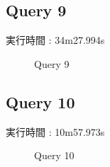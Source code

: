 \documentclass[11pt,a4paper]{jsarticle}
\newlength{\subfigwidth}
\newlength{\subfigcolsep}
\begin{document}
\subsection{Query 9}
実行時間 : 34m27.994s

\begin{figure}[bthp]
 \setlength{\subfigwidth}{.5\linewidth}
 \addtolength{\subfigwidth}{-.5\subfigcolsep}
 \begin{minipage}[b]{\subfigwidth}
 \end{minipage}
 \begin{minipage}[b]{\subfigwidth}
 \end{minipage}
  \caption{Query 9}
  \label{fig:q9}
\end{figure}

\subsection{Query 10}
実行時間 : 10m57.973s

\begin{figure}[bthp]
 \setlength{\subfigwidth}{.5\linewidth}
 \addtolength{\subfigwidth}{-.5\subfigcolsep}
 \begin{minipage}[b]{\subfigwidth}
 \end{minipage}
 \begin{minipage}[b]{\subfigwidth}
 \end{minipage}
  \caption{Query 10}
  \label{fig:q10}
\end{figure}
\end{document}
